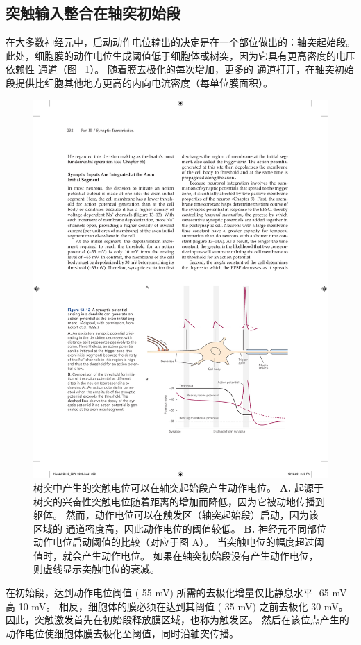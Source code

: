 \subsection{突触输入整合在轴突初始段}

在大多数神经元中，启动动作电位输出的决定是在一个部位做出的：轴突起始段。
此处，细胞膜的动作电位生成阈值低于细胞体或树突，因为它具有更高密度的电压依赖性  通道（图 ~\ref{fig:13_13}）。
随着膜去极化的每次增加，更多的  通道打开，在轴突初始段提供比细胞其他地方更高的内向电流密度（每单位膜面积）。


\begin{figure}[htbp]
	\centering
	\includegraphics[width=0.7\linewidth]{chap13/fig_13_13}
	\caption{树突中产生的突触电位可以在轴突起始段产生动作电位\cite{eckert1988propagation}。
		\textbf{A.} 起源于树突的兴奋性突触电位随着距离的增加而降低，因为它被动地传播到躯体。
		然而，动作电位可以在触发区（轴突起始段）启动，因为该区域的  通道密度高，因此动作电位的阈值较低。
		\textbf{B.} 神经元不同部位动作电位启动阈值的比较（对应于图 A）。
		当突触电位的幅度超过阈值时，就会产生动作电位。
		如果在轴突初始段没有产生动作电位，则虚线显示突触电位的衰减。}
	\label{fig:13_13}
\end{figure}


在初始段，达到动作电位阈值 (-55 mV) 所需的去极化增量仅比静息水平 -65 mV 高 10 mV。
相反，细胞体的膜必须在达到其阈值 (-35 mV) 之前去极化 30 mV。
因此，突触激发首先在初始段释放膜区域，也称为触发区。
然后在该位点产生的动作电位使细胞体膜去极化至阈值，同时沿轴突传播。


